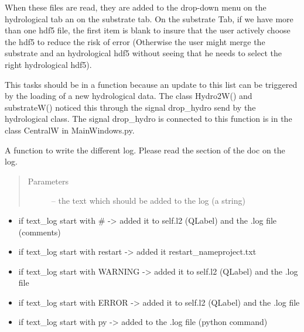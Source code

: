 \documentclass[letterpaper,10pt,english]{sphinxmanual}
\begin{document}
\begin{fulllineitems}
\begin{fulllineitems}
When these files are read, they are added to the drop-down menu on the hydrological tab an on the substrate tab.
On the substrate Tab, if we have more than one hdf5 file, the first item is blank to insure that the user
actively choose the hdf5 to reduce the risk of error (Otherwise the user might merge the substrate and
an hydrological hdf5 without seeing that he needs to select the right hydrological hdf5).

This tasks should be in a function because an update to this list can be triggered by the loading of a new
hydrological data. The class Hydro2W() and substrateW() noticed this through the signal drop\_hydro
send by the hydrological class. The signal drop\_hydro is connected to this function is in the class
CentralW in MainWindows.py.

\end{fulllineitems}


\begin{fulllineitems}
\label{\detokenize{index:src_GUI.Main_windows_1.CentralW.write_log}}
A function to write the different log. Please read the section of the doc on the log.
\begin{quote}\begin{description}
\item[{Parameters}] \leavevmode
{} -- the text which should be added to the log (a string)

\end{description}\end{quote}
\begin{itemize}
\item {} 
if text\_log start with \# -\textgreater{} added it to self.l2 (QLabel) and the .log file (comments)

\item {} 
if text\_log start with restart -\textgreater{} added it restart\_nameproject.txt

\item {} 
if text\_log start with WARNING -\textgreater{} added it to self.l2 (QLabel) and the .log file

\item {} 
if text\_log start with ERROR -\textgreater{} added it to self.l2 (QLabel) and the .log file

\item {} 
if text\_log start with py -\textgreater{} added to the .log file (python command)


\end{itemize}
\end{fulllineitems}
\end{fulllineitems}
\end{document}
